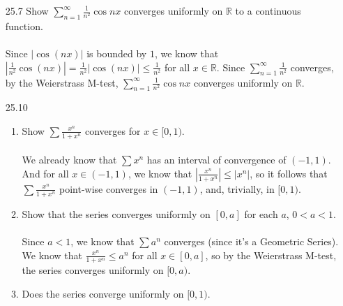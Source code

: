 
\usepackage{amsmath, amssymb, dsfont, mathtools}
\usepackage{graphicx}

\oddsidemargin 0in
\evensidemargin 0in
\textwidth 6.5in
\topmargin -0.5in
\textheight 9.0in
\newcommand{\norm}[1]{\left\lVert #1 \right\rVert}
\newcommand{\abs}[1]{\left\vert #1 \right\vert}
\newcommand{\?}{\stackrel{?}{=}}
\DeclarePairedDelimiter{\ceil}{\lceil}{\rceil}



\pagestyle{myheadings}

\begin{enumerate}
  \item [25.7]
    Show $\sum_{n=1}^{\infty} \frac{1}{n^2} \cos nx$ converges uniformly on $\mathds{R}$ to a continuous function.\\\\

    Since $\abs{\cos(nx)}$ is bounded by $1$, we know that $\abs{\frac{1}{n^2} \cos(nx)} = \frac{1}{n^2} \abs{\cos(nx)} \leq \frac{1}{n^2}$ for all $x \in \mathds{R}$. Since $\sum_{n=1}^\infty \frac{1}{n^2}$ converges, by the Weierstrass M-test, $\sum_{n=1}^{\infty} \frac{1}{n^2} \cos nx$ converges uniformly on $\mathds{R}$.
  \item [25.10]
    \begin{enumerate}
      \item Show $\sum \frac{x^n}{1 + x^n}$ converges for $x \in [0,1)$.\\\\

        We already know that $\sum x^n$ has an interval of convergence of $(-1,1)$. And for all $x \in (-1,1)$, we know that $\abs{\frac{x^n}{1+x^n}} \leq \abs{x^n}$, so it follows that $\sum \frac{x^n}{1+x^n}$ point-wise converges in $(-1,1)$, and, trivially, in $[0,1)$.
      \item Show that the series converges uniformly on $[0,a]$ for each $a$, $0 < a < 1$.\\\\

        Since $a < 1$, we know that $\sum a^n$ converges (since it's a Geometric Series). We know that $\frac{x^n}{1 + x^n} \leq a^n$ for all $x \in [0,a]$, so by the Weierstrass M-test, the series converges uniformly on $[0,a)$.
      \item Does the series converge uniformly on $[0,1)$.\\\\


\end{enumerate}
\end{enumerate}
